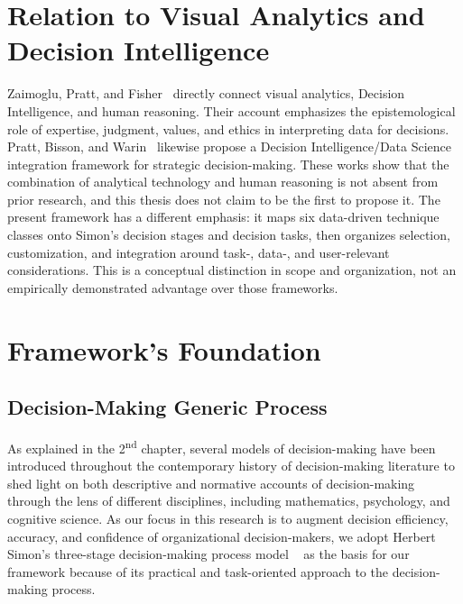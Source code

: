 \documentclass{sfuthesis}
\begin{document}
\section{Relation to Visual Analytics and Decision Intelligence}
Zaimoglu, Pratt, and Fisher~\cite{zaimoglu2023epistemological} directly connect visual analytics, Decision Intelligence, and human reasoning. Their account emphasizes the epistemological role of expertise, judgment, values, and ethics in interpreting data for decisions. Pratt, Bisson, and Warin~\cite{pratt_bringing_2023} likewise propose a Decision Intelligence/Data Science integration framework for strategic decision-making. These works show that the combination of analytical technology and human reasoning is not absent from prior research, and this thesis does not claim to be the first to propose it. The present framework has a different emphasis: it maps six data-driven technique classes onto Simon's decision stages and decision tasks, then organizes selection, customization, and integration around task-, data-, and user-relevant considerations. This is a conceptual distinction in scope and organization, not an empirically demonstrated advantage over those frameworks.\par
\section{Framework's Foundation}
\subsection{Decision-Making Generic Process}
As explained in the 2\textsuperscript{nd} chapter, several models of decision-making have been introduced throughout the contemporary history of decision-making literature to shed light on both descriptive and normative accounts of decision-making through the lens of different disciplines, including mathematics, psychology, and cognitive science. As our focus in this research is to augment decision efficiency, accuracy, and confidence of organizational decision-makers, we adopt Herbert Simon’s three-stage decision-making process model ~\cite{simon1960new} as the basis for our framework because of its practical and task-oriented approach to the decision-making process.\par
\end{document}
